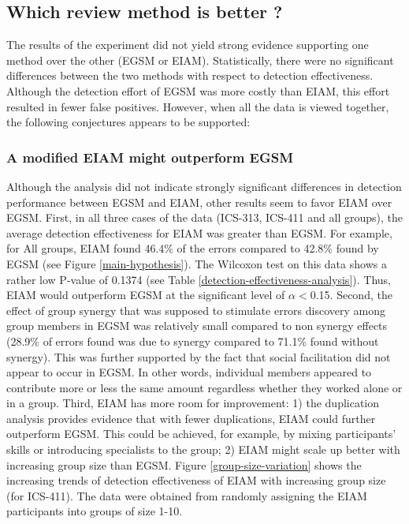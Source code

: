 

\subsection{Which review method is better ?} 

The results of the experiment did not yield strong
evidence supporting one method over the other (EGSM or EIAM). 
Statistically, there were no significant differences between the two
methods with respect to detection effectiveness.
Although the detection effort of EGSM was more costly than EIAM, 
this effort resulted in fewer false positives.
However, when all the data is viewed together, the following
conjectures appears to be supported:

\subsubsection{A modified EIAM might outperform EGSM}
\label{sec:eiam-may-be-better}
Although the analysis did not indicate strongly significant differences in
detection performance between EGSM and EIAM,
other results seem to favor EIAM over EGSM.  
First, in all three cases of the data (ICS-313, ICS-411 and all
groups), the  average detection effectiveness for EIAM was greater
than EGSM. For 
example, for All groups, EIAM found 46.4\% of the errors compared to
42.8\% found by EGSM (see Figure \ref{main-hypothesis}). The Wilcoxon
test on this data shows a rather low P-value of 0.1374
(see Table \ref{detection-effectiveness-analysis}). Thus,
EIAM would outperform EGSM at the significant level of $\alpha<$0.15.
Second, the effect of group synergy that was supposed to stimulate
errors  discovery among group members in EGSM was relatively small
compared to non synergy effects (28.9\% of errors found was due to synergy
compared to 71.1\% found without synergy). 
This was further supported by the fact that social
facilitation did not appear to occur in EGSM. In other words,
individual members appeared to contribute 
more or less the same amount regardless whether they worked alone or
in a group. Third, EIAM has more room for improvement: 1) the duplication
analysis provides evidence that with fewer duplications,
EIAM could further outperform EGSM. This could be achieved, for example,
by mixing participants' skills or introducing 
specialists to the group; 2) EIAM might scale up better with
increasing group size than EGSM.
Figure \ref{group-size-variation} shows the increasing trends of
detection  
effectiveness of EIAM with increasing group size (for ICS-411). The
data were obtained from randomly assigning the EIAM  participants into  
groups of size 1-10. 

